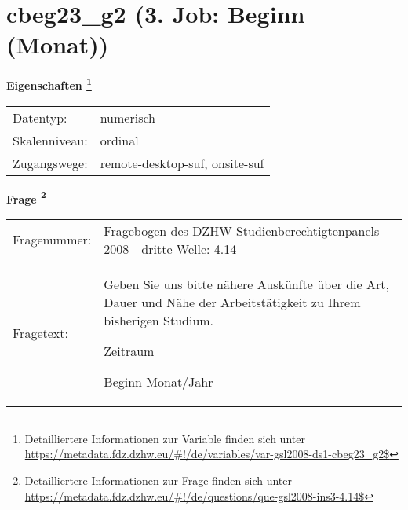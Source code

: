 
    \setcounter{footnote}{0}

    \vspace*{-1.8cm}
	\section{cbeg23\_g2 (3. Job: Beginn (Monat))}
	\label{section:cbeg23_g2}



    \vspace*{0.5cm}
    \noindent\textbf{Eigenschaften
	\footnote{Detailliertere Informationen zur Variable finden sich unter
		\url{https://metadata.fdz.dzhw.eu/\#!/de/variables/var-gsl2008-ds1-cbeg23_g2$}}}\\
	\begin{tabularx}{\hsize}{@{}lX}
	Datentyp: & numerisch \\
	Skalenniveau: & ordinal \\
	Zugangswege: &
	  remote-desktop-suf, 
	  onsite-suf
 \\
    \end{tabularx}



				\vspace*{0.5cm}
                \noindent\textbf{Frage
	                \footnote{Detailliertere Informationen zur Frage finden sich unter
		              \url{https://metadata.fdz.dzhw.eu/\#!/de/questions/que-gsl2008-ins3-4.14$}}}\\
				\begin{tabularx}{\hsize}{@{}lX}
					Fragenummer: &
					  Fragebogen des DZHW-Studienberechtigtenpanels 2008 - dritte Welle:
					  4.14
 \\
					Fragetext: & Geben Sie uns bitte nähere Auskünfte über die Art, Dauer und Nähe der Arbeitstätigkeit zu Ihrem bisherigen Studium.\par  Zeitraum\par  Beginn Monat/Jahr \\
				\end{tabularx}





